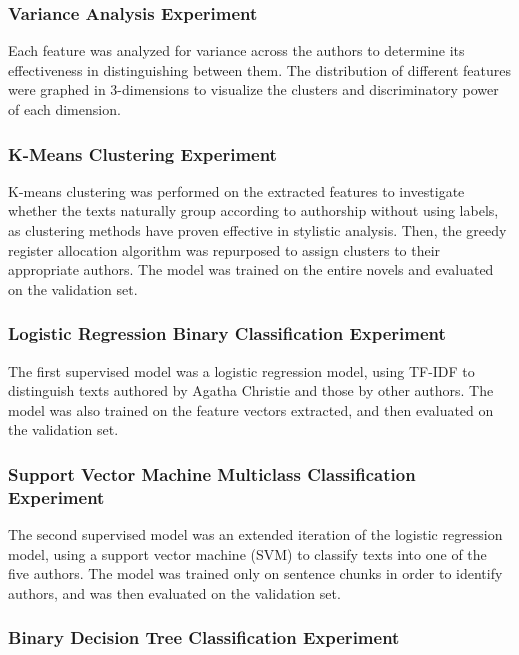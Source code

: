 \documentclass[journal]{IEEEtran} %
\begin{document}
\subsubsection{Variance Analysis Experiment}

Each feature was analyzed for variance across the authors to determine its effectiveness in distinguishing between them. The distribution of different features were graphed in 3-dimensions to visualize the clusters and discriminatory power of each dimension.

\subsubsection{K-Means Clustering Experiment}

K-means clustering was performed on the extracted features to investigate whether the texts naturally group according to authorship without using labels, as clustering methods have proven effective in stylistic analysis. \cite{roelleke} Then, the greedy register allocation algorithm was repurposed to assign clusters to their appropriate authors. The model was trained on the entire novels and evaluated on the validation set.

\subsubsection{Logistic Regression Binary Classification Experiment}

The first supervised model was a logistic regression model, using TF-IDF to distinguish texts authored by Agatha Christie and those by other authors.
The model was also trained on the feature vectors extracted, and then evaluated on the validation set.

\subsubsection{Support Vector Machine Multiclass Classification Experiment}

The second supervised model was an extended iteration of the logistic regression model, using a support vector machine (SVM) to classify texts into one of the five authors. The model was trained only on sentence chunks in order to identify authors, and was then evaluated on the validation set.

\subsubsection{Binary Decision Tree Classification Experiment}
\end{document}
